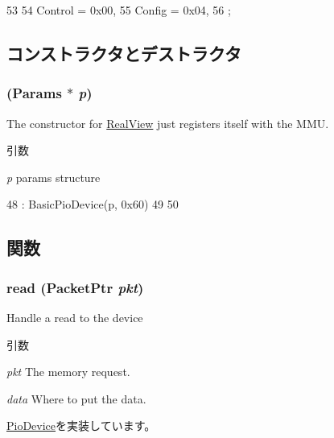 \begin{DoxyCode}
53          {
54         Control     = 0x00,
55         Config      = 0x04,
56     };
\end{DoxyCode}


\subsection{コンストラクタとデストラクタ}
\hypertarget{classA9SCU_aafe83320aca70b23aeacd2370cc7c905}{
\subsubsection[{A9SCU}]{ ({\bf Params} $\ast$ {\em p})}}
\label{classA9SCU_aafe83320aca70b23aeacd2370cc7c905}
The constructor for \hyperlink{classRealView}{RealView} just registers itself with the MMU. 
\begin{DoxyParams}{引数}
\item[{\em p}]params structure \end{DoxyParams}



\begin{DoxyCode}
48     : BasicPioDevice(p, 0x60)
49 {
50 }
\end{DoxyCode}


\subsection{関数}
\hypertarget{classA9SCU_a613ec7d5e1ec64f8d21fec78ae8e568e}{
\subsubsection[{read}]{ read ({\bf PacketPtr} {\em pkt})}}
\label{classA9SCU_a613ec7d5e1ec64f8d21fec78ae8e568e}
Handle a read to the device 
\begin{DoxyParams}{引数}
\item[{\em pkt}]The memory request. \item[{\em data}]Where to put the data. \end{DoxyParams}


\hyperlink{classPioDevice_a842312590432036092c422c87a442358}{PioDevice}を実装しています。



